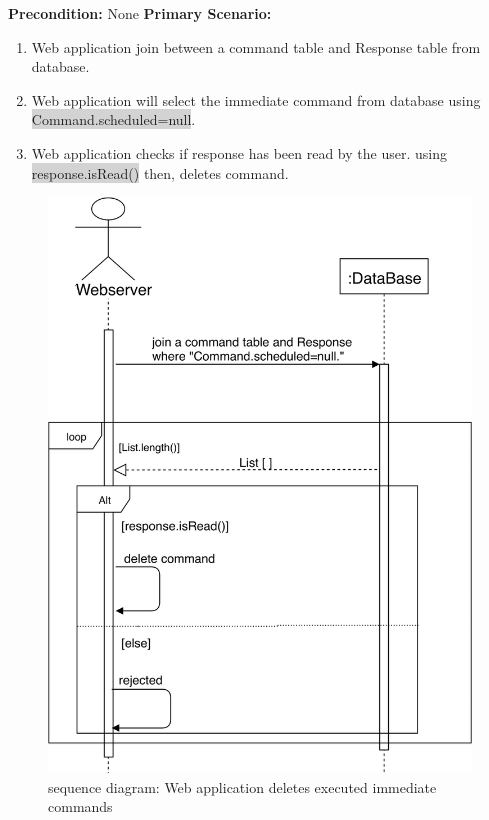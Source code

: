 \documentclass[12pt, oneside, a4paper]{book}
\newcommand{\code}[1]{{\color{red}\colorbox{lightgray}{#1}}}
\begin{document}
				\newline\textbf{Precondition:} None
				\newline\textbf{Primary Scenario:}	
				\begin{enumerate}[label*=\arabic*.]
					\item Web application join between a command table and Response table from database.  
					\item  Web application will select the immediate command from database using \code{Command.scheduled=null}.
					\item Web application checks if response has been read by the user. using \code{response.isRead()} then, deletes command.
				\end{enumerate}
				\begin{figure}[H]
					\includegraphics[width=\linewidth]{img/sequence_w_delete_c.png}
					\caption{sequence diagram: Web application deletes executed immediate commands}
					\label{web_delete_c}
				\end{figure}
\end{document}
